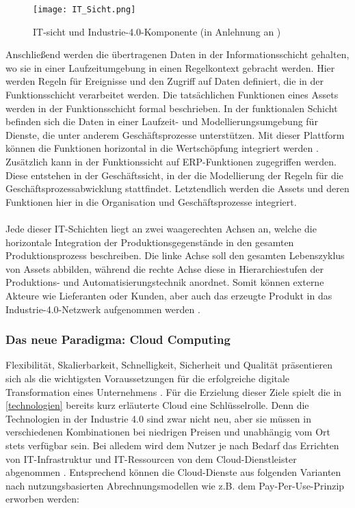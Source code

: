 \begin{figure}[h]
  \centering
  \texttt{[image: IT\_Sicht.png]}
  \caption[IT-sicht und Industrie-4.0-Komponente]{IT-sicht und Industrie-4.0-Komponente (in Anlehnung an \citet[S. 118]{Adolphs2017}) }
  \label{it_layer}
\end{figure}
Anschließend werden die übertragenen Daten in der Informationsschicht gehalten, wo sie in einer Laufzeitumgebung in einen Regelkontext gebracht werden. Hier werden Regeln für Ereignisse und den Zugriff auf Daten definiert, die in der Funktionsschicht verarbeitet werden. Die tatsächlichen Funktionen eines Assets werden in der Funktionsschicht formal beschrieben. In der funktionalen Schicht befinden sich die Daten in einer Laufzeit- und Modellierungsumgebung für Dienste, die unter anderem Geschäftsprozesse unterstützen. Mit dieser Plattform können die Funktionen horizontal in die Wertschöpfung integriert werden \citep{Huebner2017}. Zusätzlich kann in der Funktionssicht auf ERP-Funktionen zugegriffen werden. Diese entstehen in der Geschäftssicht, in der die Modellierung der Regeln für die Geschäftsprozessabwicklung stattfindet. Letztendlich werden die Assets und deren Funktionen hier in die Organisation und Geschäftsprozesse integriert.
\\\\
Jede dieser IT-Schichten liegt an zwei waagerechten Achsen an, welche die horizontale Integration der Produktionsgegenstände in den gesamten Produktionsprozess beschreiben. Die linke Achse soll den gesamten Lebenszyklus von Assets abbilden, während die rechte Achse diese in Hierarchiestufen der Produktions- und Automatisierungstechnik anordnet. Somit können externe Akteure wie Lieferanten oder Kunden, aber auch das erzeugte Produkt in das Industrie-4.0-Netzwerk aufgenommen werden \citep{BITKOM2015}. 

\subsubsection{Das neue Paradigma: Cloud Computing} \label{cloud}

Flexibilität, Skalierbarkeit, Schnelligkeit, Sicherheit und Qualität präsentieren sich als die wichtigsten Voraussetzungen für die erfolgreiche digitale Transformation eines Unternehmens \citep{Acharya2019}. Für die Erzielung dieser Ziele spielt die in \ref{technologien} bereits kurz erläuterte Cloud eine Schlüsselrolle. Denn die Technologien in der Industrie 4.0 sind zwar nicht neu, aber sie müssen in verschiedenen Kombinationen bei niedrigen Preisen und unabhängig vom Ort stets verfügbar sein. Bei alledem wird dem Nutzer je nach Bedarf das Errichten von IT-Infrastruktur und IT-Ressourcen von dem Cloud-Dienstleister abgenommen \citep{Dzombeta2017}. Entsprechend können die Cloud-Dienste aus folgenden Varianten nach nutzungsbasierten Abrechnungsmodellen wie z.B. dem Pay-Per-Use-Prinzip erworben werden:


